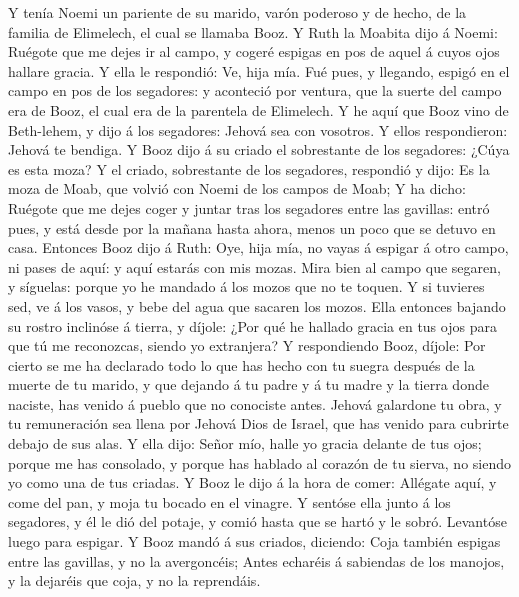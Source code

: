  Y tenía Noemi un pariente de su marido, varón poderoso y
de hecho, de la familia de Elimelech, el cual se llamaba Booz.
 Y Ruth la Moabita dijo á Noemi: Ruégote que me dejes ir
al campo, y cogeré espigas en pos de aquel á cuyos ojos hallare gracia.
Y ella le respondió: Ve, hija mía.  Fué pues, y llegando,
espigó en el campo en pos de los segadores: y aconteció por ventura, que
la suerte del campo era de Booz, el cual era de la parentela de
Elimelech.  Y he aquí que Booz vino de Beth-lehem, y dijo
á los segadores: Jehová sea con vosotros. Y ellos respondieron: Jehová
te bendiga.  Y Booz dijo á su criado el sobrestante de los
segadores: ¿Cúya es esta moza?  Y el criado, sobrestante
de los segadores, respondió y dijo: Es la moza de Moab, que volvió con
Noemi de los campos de Moab;  Y ha dicho: Ruégote que me
dejes coger y juntar tras los segadores entre las gavillas: entró pues,
y está desde por la mañana hasta ahora, menos un poco que se detuvo en
casa.  Entonces Booz dijo á Ruth: Oye, hija mía, no vayas
á espigar á otro campo, ni pases de aquí: y aquí estarás con mis mozas.
 Mira bien al campo que segaren, y síguelas: porque yo he
mandado á los mozos que no te toquen. Y si tuvieres sed, ve á los vasos,
y bebe del agua que sacaren los mozos.  Ella entonces
bajando su rostro inclinóse á tierra, y díjole: ¿Por qué he hallado
gracia en tus ojos para que tú me reconozcas, siendo yo extranjera?
 Y respondiendo Booz, díjole: Por cierto se me ha
declarado todo lo que has hecho con tu suegra después de la muerte de tu
marido, y que dejando á tu padre y á tu madre y la tierra donde naciste,
has venido á pueblo que no conociste antes.  Jehová
galardone tu obra, y tu remuneración sea llena por Jehová Dios de
Israel, que has venido para cubrirte debajo de sus alas. 
Y ella dijo: Señor mío, halle yo gracia delante de tus ojos; porque me
has consolado, y porque has hablado al corazón de tu sierva, no siendo
yo como una de tus criadas.  Y Booz le dijo á la hora de
comer: Allégate aquí, y come del pan, y moja tu bocado en el vinagre. Y
sentóse ella junto á los segadores, y él le dió del potaje, y comió
hasta que se hartó y le sobró.  Levantóse luego para
espigar. Y Booz mandó á sus criados, diciendo: Coja también espigas
entre las gavillas, y no la avergoncéis;  Antes echaréis
á sabiendas de los manojos, y la dejaréis que coja, y no la reprendáis.
